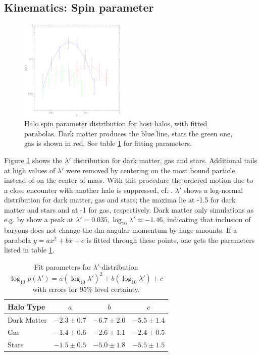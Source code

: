 \documentclass[useAMS,usenatbib]{mn2e}
\begin{document}
\subsection{Kinematics: Spin parameter}
%
%
\begin{figure}
  \begin{center}
    \includegraphics[width=0.45\textwidth]{fig/lprime_dgs/out.eps}
  \end{center}

  \caption{ \label{fig:lprime_dgs} Halo spin parameter distribution for host
    halos, with fitted parabolas. Dark matter produces the blue line, stars
    the green one, gas is shown in red. See table \ref{tab:fitparm} for
    fitting parameters.}
\end{figure}
%
%
Figure \ref{fig:lprime_dgs} shows the $\lambda'$ distribution for dark matter,
gas and stars. Additional tails at high values of $\lambda'$ were removed by
centering on the most bound particle instead of on the center of mass. With
this procedure the ordered motion due to a close encounter with another halo
is suppressed, cf. \cite{Hahn2007a}. $\lambda'$ shows a log-normal
distribution for dark matter, gas and stars; the maxima lie at -1.5 for dark
matter and stars and at -1 for gas, respectively. Dark matter only simulations
as e.g. by \cite{Bullock2001} show a peak at
$\lambda'=0.035,\log_{10}\lambda'\approx-1.46$, indicating that inclusion of
baryons does not change the dm angular momentum by huge amounts.
%
If a parabola $y=ax^2+bx+c$ is fitted through these points, one gets the
parameters listed in table \ref{tab:fitparm}.
%
\begin{table}    \label{tab:fitparm}
  \begin{center}
    \begin{tabular}{lccc}
      \hline
      Halo Type & $a$ & $b$ & $c$ \\
      \hline
      Dark Matter & $-2.3\pm0.7$ & $-6.7\pm2.0$ & $-5.5\pm1.4$ \\
      Gas & $-1.4\pm0.6$ & $-2.6\pm1.1$ & $-2.4\pm0.5$ \\
      Stars & $-1.5\pm0.5$ & $-5.0\pm1.8$ & $-5.5\pm1.5$ \\
      \hline
  \end{tabular}
  \end{center}

 \caption{ Fit parameters for $\lambda'$-distribution
   $\log_{10}p(\lambda')=a(\log_{10}\lambda')^2+b(\log_{10}\lambda')+c$ with
   errors for $95\%$ level certainty.}
\end{table}
%
\end{document}

